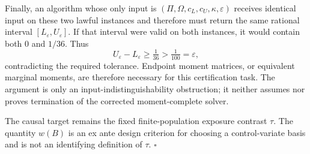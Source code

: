 Finally, an algorithm whose only input is \((\Pi,\Omega,c_L,c_U,\kappa,\varepsilon)\) receives identical input on these two lawful instances and therefore must return the same rational interval \([L_\varepsilon,U_\varepsilon]\).  If that interval were valid on both instances, it would contain both \(0\) and \(1/36\).  Thus
\[
U_\varepsilon-L_\varepsilon\ge\tfrac1{36}>\tfrac1{100}=\varepsilon,
\]
contradicting the required tolerance.  Endpoint moment matrices, or equivalent marginal moments, are therefore necessary for this certification task.  The argument is only an input-indistinguishability obstruction; it neither assumes nor proves termination of the corrected moment-complete solver.

The causal target remains the fixed finite-population exposure contrast \(\tau\).  The quantity \(w(B)\) is an ex ante design criterion for choosing a control-variate basis and is not an identifying definition of \(\tau\).  \(\square\)